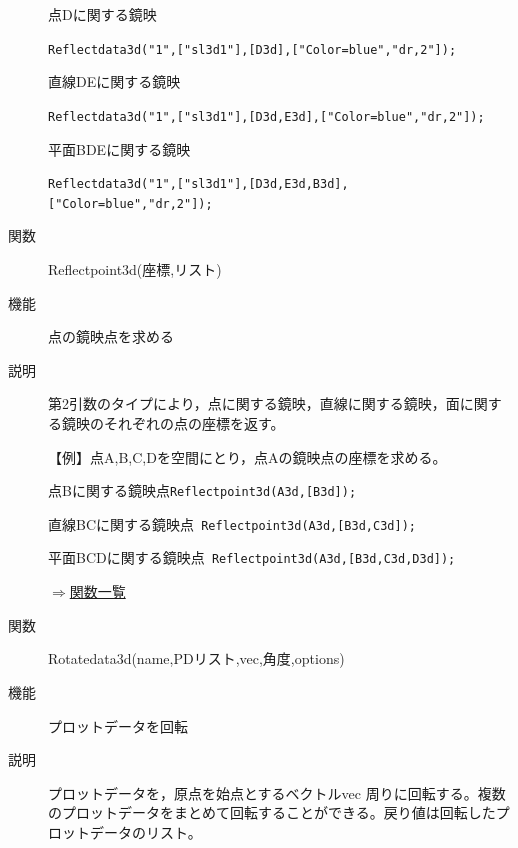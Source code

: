 \documentclass[papersize,a4paper,12pt,uplatex]{jsarticle}
\begin{document}
\begin{description}
点Dに関する鏡映

 \verb|Reflectdata3d("1",["sl3d1"],[D3d],["Color=blue","dr,2"]);|

\hspace{20mm} 

直線DEに関する鏡映 

 \verb|Reflectdata3d("1",["sl3d1"],[D3d,E3d],["Color=blue","dr,2"]);|

\hspace{20mm} 

平面BDEに関する鏡映

\verb|Reflectdata3d("1",["sl3d1"],[D3d,E3d,B3d],["Color=blue","dr,2"]);|

\hspace{20mm} 
 
 
\vspace{\baselineskip}
\hypertarget{reflectpoint3d}{}
\item[関数]Reflectpoint3d(座標,リスト)
\item[機能]点の鏡映点を求める
\item[説明]第2引数のタイプにより，点に関する鏡映，直線に関する鏡映，面に関する鏡映のそれぞれの点の座標を返す。

\vspace{\baselineskip}
【例】点A,B,C,Dを空間にとり，点Aの鏡映点の座標を求める。

点Bに関する鏡映点\verb|Reflectpoint3d(A3d,[B3d]);|

直線BCに関する鏡映点\verb| Reflectpoint3d(A3d,[B3d,C3d]);|

平面BCDに関する鏡映点\verb| Reflectpoint3d(A3d,[B3d,C3d,D3d]);|
 
\begin{flushright} \hyperlink{functionlist}{$\Rightarrow$関数一覧}\end{flushright}

\vspace{\baselineskip}
\hypertarget{rotatedata3d}{}
\item[関数]Rotatedata3d(name,PDリスト,vec,角度,options)
\item[機能]プロットデータを回転
\item[説明]プロットデータを，原点を始点とするベクトルvec 周りに回転する。複数のプロットデータをまとめて回転することができる。戻り値は回転したプロットデータのリスト。


\end{description}
\end{document}
